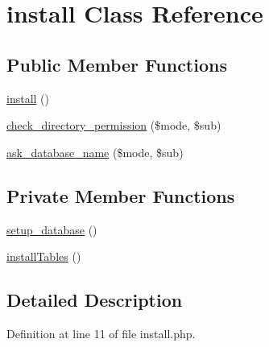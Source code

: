 \hypertarget{classinstall}{\section{install Class Reference}
\label{classinstall}
}
\subsection*{Public Member Functions}
\begin{DoxyCompactItemize}
\item 
\hyperlink{classinstall_a6a8bcb2f7b567c588f4a474d46804440}{install} ()
\item 
\hyperlink{classinstall_a4e720dd6e62b63da8033cecf60d5eaed}{check\-\_\-directory\-\_\-permission} (\$mode, \$sub)
\item 
\hyperlink{classinstall_a27e554353c8f7b9eef9bc401f11765cf}{ask\-\_\-database\-\_\-name} (\$mode, \$sub)
\end{DoxyCompactItemize}
\subsection*{Private Member Functions}
\begin{DoxyCompactItemize}
\item 
\hyperlink{classinstall_a8b2e00c7cc9a5031e9c98b4b6aa2c035}{setup\-\_\-database} ()
\item 
\hyperlink{classinstall_a7d4d4748cd5c10e21c951a75e5a55f10}{install\-Tables} ()
\end{DoxyCompactItemize}


\subsection{Detailed Description}


Definition at line 11 of file install.\-php.



